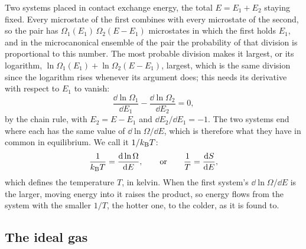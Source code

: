 Two systems placed in contact exchange energy, the total $E = E_1 + E_2$
staying fixed. Every microstate of the first combines with every
microstate of the second, so the pair has $\Omega_1(E_1)\,\Omega_2(E -
E_1)$ microstates in which the first holds $E_1$, and in the
microcanonical ensemble of the pair the probability of that division is
proportional to this number. The most probable division makes it largest,
or its logarithm, $\ln\Omega_1(E_1) + \ln\Omega_2(E - E_1)$, largest, which is
the same division since the logarithm rises whenever its argument does;
this needs its derivative with respect to $E_1$ to vanish:
\begin{equation*}
   \frac{\dd\ln\Omega_1}{\dd E_1} - \frac{\dd\ln\Omega_2}{\dd E_2} = 0 ,
\end{equation*}
by the chain rule, with $E_2 = E - E_1$ and $\dd E_2/\dd E_1 = -1$. The
two systems end where each has the same value of $\dd\ln\Omega/\dd E$,
which is therefore what they have in common in equilibrium. We call it
$1/k_{\mathrm{B}} T$:
\begin{equation}
   \frac{1}{k_{\mathrm{B}} T} = \frac{\mathrm{d}\ln\Omega}{\mathrm{d} E} , \qquad\text{or}\qquad
   \frac1T = \frac{\mathrm{d} S}{\mathrm{d} E} ,
   \label{eq:sm-temperature}
\end{equation}
which defines the temperature $T$, in kelvin. When the first system's
$\dd\ln\Omega/\dd E$ is the larger, moving energy into it raises the
product, so energy flows from the system with the smaller $1/T$, the
hotter one, to the colder, as it is found to.

\subsection*{The ideal gas}

